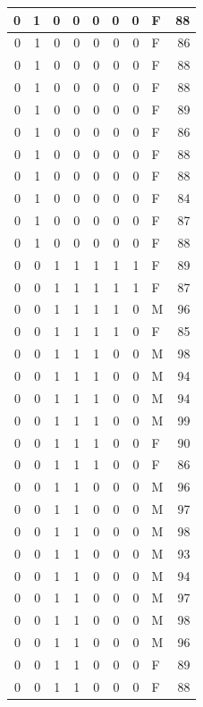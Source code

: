 \documentclass[
  12pt,
]{krantz}
\begin{document}
\begin{tabular}{r|r|r|r|r|r|r|l|r}
\hline
0 & 1 & 0 & 0 & 0 & 0 & 0 & F & 88\\
\hline
0 & 1 & 0 & 0 & 0 & 0 & 0 & F & 86\\
\hline
0 & 1 & 0 & 0 & 0 & 0 & 0 & F & 88\\
\hline
0 & 1 & 0 & 0 & 0 & 0 & 0 & F & 88\\
\hline
0 & 1 & 0 & 0 & 0 & 0 & 0 & F & 89\\
\hline
0 & 1 & 0 & 0 & 0 & 0 & 0 & F & 86\\
\hline
0 & 1 & 0 & 0 & 0 & 0 & 0 & F & 88\\
\hline
0 & 1 & 0 & 0 & 0 & 0 & 0 & F & 88\\
\hline
0 & 1 & 0 & 0 & 0 & 0 & 0 & F & 84\\
\hline
0 & 1 & 0 & 0 & 0 & 0 & 0 & F & 87\\
\hline
0 & 1 & 0 & 0 & 0 & 0 & 0 & F & 88\\
\hline
0 & 0 & 1 & 1 & 1 & 1 & 1 & F & 89\\
\hline
0 & 0 & 1 & 1 & 1 & 1 & 1 & F & 87\\
\hline
0 & 0 & 1 & 1 & 1 & 1 & 0 & M & 96\\
\hline
0 & 0 & 1 & 1 & 1 & 1 & 0 & F & 85\\
\hline
0 & 0 & 1 & 1 & 1 & 0 & 0 & M & 98\\
\hline
0 & 0 & 1 & 1 & 1 & 0 & 0 & M & 94\\
\hline
0 & 0 & 1 & 1 & 1 & 0 & 0 & M & 94\\
\hline
0 & 0 & 1 & 1 & 1 & 0 & 0 & M & 99\\
\hline
0 & 0 & 1 & 1 & 1 & 0 & 0 & F & 90\\
\hline
0 & 0 & 1 & 1 & 1 & 0 & 0 & F & 86\\
\hline
0 & 0 & 1 & 1 & 0 & 0 & 0 & M & 96\\
\hline
0 & 0 & 1 & 1 & 0 & 0 & 0 & M & 97\\
\hline
0 & 0 & 1 & 1 & 0 & 0 & 0 & M & 98\\
\hline
0 & 0 & 1 & 1 & 0 & 0 & 0 & M & 93\\
\hline
0 & 0 & 1 & 1 & 0 & 0 & 0 & M & 94\\
\hline
0 & 0 & 1 & 1 & 0 & 0 & 0 & M & 97\\
\hline
0 & 0 & 1 & 1 & 0 & 0 & 0 & M & 98\\
\hline
0 & 0 & 1 & 1 & 0 & 0 & 0 & M & 96\\
\hline
0 & 0 & 1 & 1 & 0 & 0 & 0 & F & 89\\
\hline
0 & 0 & 1 & 1 & 0 & 0 & 0 & F & 88\\

\end{tabular}
\end{document}
